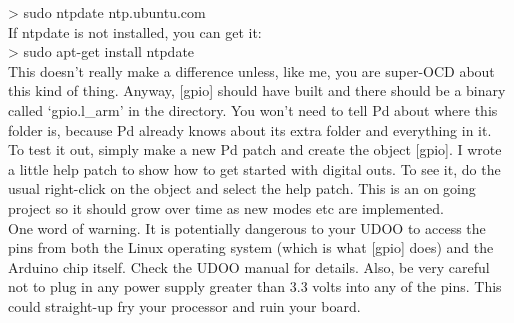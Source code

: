 \documentclass{article}
\begin{document}
\textgreater{} sudo ntpdate ntp.ubuntu.com\\

If ntpdate is not installed, you can get it:\\

\textgreater{} sudo apt-get install ntpdate\\

This doesn't really make a difference unless, like me, you are super-OCD about this kind of thing. Anyway, [gpio] should have built and there should be a binary called `gpio.l\_arm' in the directory. You won't need to tell Pd about where this folder is, because Pd already knows about its extra folder and everything in it.\\

To test it out, simply make a new Pd patch and create the object [gpio]. I wrote a little help patch to show how to get started with digital outs. To see it, do the usual right-click on the object and select the help patch. This is an on going project so it should grow over time as new modes etc are implemented.\\ 

One word of warning. It is potentially dangerous to your UDOO to access the pins from both the Linux operating system (which is what [gpio] does) and the Arduino chip itself. Check the UDOO manual for details. Also, be very careful not to plug in any power supply greater than 3.3 volts into any of the pins. This could straight-up fry your processor and ruin your board.
\end{document}
